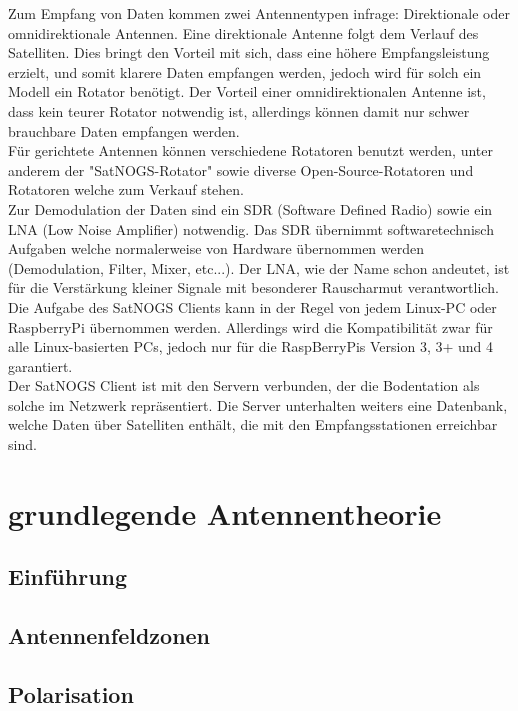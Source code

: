 \documentclass[12pt]{scrreprt}
\begin{document}
	Zum Empfang von Daten kommen zwei Antennentypen infrage: Direktionale oder omnidirektionale Antennen. Eine direktionale Antenne folgt dem Verlauf des Satelliten. Dies bringt den Vorteil mit sich, dass eine höhere Empfangsleistung erzielt, und somit klarere Daten empfangen werden, jedoch wird für solch ein Modell ein Rotator benötigt. Der Vorteil einer omnidirektionalen Antenne ist, dass kein teurer Rotator notwendig ist, allerdings können damit nur schwer brauchbare Daten empfangen werden.\\
	
	
	Für gerichtete Antennen können verschiedene Rotatoren benutzt werden, unter anderem der "SatNOGS-Rotator" sowie diverse Open-Source-Rotatoren und Rotatoren welche zum Verkauf stehen.\\
	
	
	Zur Demodulation der Daten sind ein SDR (Software Defined Radio) sowie ein LNA (Low Noise Amplifier) notwendig. Das SDR übernimmt softwaretechnisch Aufgaben welche normalerweise von Hardware übernommen werden (Demodulation, Filter, Mixer, etc...). Der LNA, wie der Name schon andeutet, ist für die Verstärkung kleiner Signale mit besonderer Rauscharmut verantwortlich. \\
	
	
	Die Aufgabe des SatNOGS Clients kann in der Regel von jedem Linux-PC oder RaspberryPi übernommen werden. Allerdings wird die Kompatibilität zwar für alle Linux-basierten PCs, jedoch nur für die RaspBerryPis Version 3, 3+ und 4 garantiert.\\
	
	
	Der SatNOGS Client ist mit den Servern verbunden, der die Bodentation als solche im Netzwerk repräsentiert. Die Server unterhalten weiters eine Datenbank, welche Daten über Satelliten enthält, die mit den Empfangsstationen erreichbar sind.
	\pagebreak
	
	\section{grundlegende Antennentheorie}
	\subsection{Einführung}
	
	\subsection{Antennenfeldzonen}
	
	\subsection{Polarisation}
	
\end{document}

